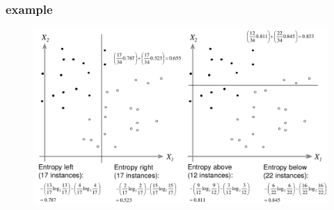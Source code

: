 \documentclass{beamer}
\begin{document}
\begin{frame}
\frametitle{example}
\begin{figure}
\includegraphics[width = 1\linewidth]{figures/04/01_classification/example_decision_2.png}
\end{figure}
\end{frame}
\end{document}
